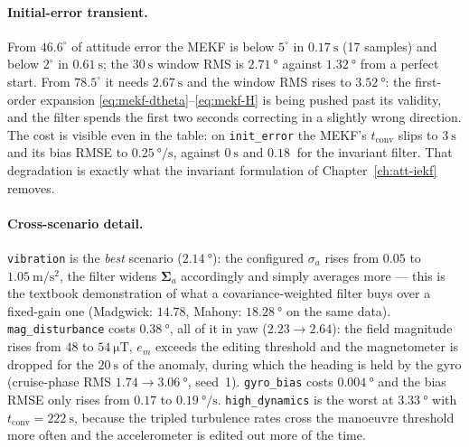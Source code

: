 \paragraph{Initial-error transient.} From $46.6^\circ$ of attitude error the MEKF is below $5^\circ$
in $\SI{0.17}{\second}$ (17 samples) and below $2^\circ$ in $\SI{0.61}{\second}$; the
$\SI{30}{\second}$ window RMS is $\SI{2.71}{\degree}$ against $\SI{1.32}{\degree}$ from a perfect
start. From $78.5^\circ$ it needs $\SI{2.67}{\second}$ and the window RMS rises to
$\SI{3.52}{\degree}$: the first-order expansion
\eqref{eq:mekf-dtheta}--\eqref{eq:mekf-H} is being pushed past its validity, and the filter spends
the first two seconds correcting in a slightly wrong direction. The cost is visible even in the
table: on \texttt{init\_error} the MEKF's $t_{\text{conv}}$ slips to $\SI{3}{\second}$ and its bias
RMSE to $\SI{0.25}{\degree\per\second}$, against $\SI{0}{\second}$ and $\SI{0.18}{}$ for the
invariant filter. That degradation is exactly what the invariant formulation of
Chapter~\ref{ch:att-iekf} removes.

\paragraph{Cross-scenario detail.} \texttt{vibration} is the \emph{best} scenario
($\SI{2.14}{\degree}$): the configured $\sigma_a$ rises from $0.05$ to
$\SI{1.05}{\metre\per\second\squared}$, the filter widens $\bm{\Sigma}_a$ accordingly and simply
averages more --- this is the textbook demonstration of what a covariance-weighted filter buys over
a fixed-gain one (Madgwick: $14.78$, Mahony: $\SI{18.28}{\degree}$ on the same data).
\texttt{mag\_disturbance} costs $\SI{0.38}{\degree}$, all of it in yaw ($2.23\to2.64$): the field
magnitude rises from $48$ to $\SI{54}{\micro\tesla}$, $e_m$ exceeds the editing threshold and the
magnetometer is dropped for the $\SI{20}{\second}$ of the anomaly, during which the heading is held
by the gyro (cruise-phase RMS $1.74\to\SI{3.06}{\degree}$, seed~1). \texttt{gyro\_bias} costs
$\SI{0.004}{\degree}$ and the bias RMSE only rises from $0.17$ to $\SI{0.19}{\degree\per\second}$.
\texttt{high\_dynamics} is the worst at $\SI{3.33}{\degree}$ with
$t_{\text{conv}}=\SI{222}{\second}$, because the tripled turbulence rates cross the manoeuvre
threshold more often and the accelerometer is edited out more of the time.

